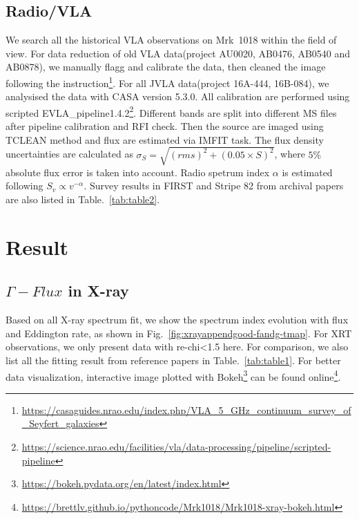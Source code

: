 \documentclass{aastex63}
\begin{document}
\subsection{Radio/VLA}\label{subsec:vla}
We search all the historical VLA observations on Mrk~1018 within the field of view. For data reduction of old VLA data(project AU0020, AB0476, AB0540 and AB0878), we manually flagg and calibrate the data, then cleaned the image following the instruction\footnote{\url{https://casaguides.nrao.edu/index.php/VLA_5_GHz_continuum_survey_of_Seyfert_galaxies}}. For all JVLA data(project 16A-444, 16B-084),  we analysised the data with CASA version 5.3.0\citep{2007ASPC..376..127M}. All calibration are performed using scripted EVLA\_pipeline1.4.2\footnote{\url{https://science.nrao.edu/facilities/vla/data-processing/pipeline/scripted-pipeline}}. Different bands are split into different MS files after pipeline calibration and RFI check. Then the source are imaged using TCLEAN method and flux are estimated via IMFIT task. The flux density uncertainties are calculated as $\sigma_{S}=\sqrt{(rms)^2+(0.05\times S)^2}$, where $5\%$ absolute flux error is taken into account. Radio spetrum index $\alpha$ is estimated following $S_v \propto v^{-\alpha}$. Survey results in FIRST\citep{1994ASPC...61..165B,1995ApJ...450..559B} and Stripe 82\citep{2011AJ....142....3H} from archival papers are also listed in Table.~\ref{tab:table2}.

\section{Result}\label{sec:result}

\subsection{$\Gamma-Flux$ in X-ray}\label{subsec:g-f}
Based on all X-ray spectrum fit, we show the spectrum index evolution with flux and Eddington rate, as shown in Fig.~\ref{fig:xrayappendgood-fandg-tmap}. For XRT observations, we only present data with re-chi<1.5 here. For comparison, we also list all the fitting result from reference papers in Table.~\ref{tab:table1}. For better data visualization, interactive image plotted with Bokeh\footnote{\url{https://bokeh.pydata.org/en/latest/index.html}} can be found online\footnote{\url{https://brettlv.github.io/pythoncode/Mrk1018/Mrk1018-xray-bokeh.html}}.
\end{document}
